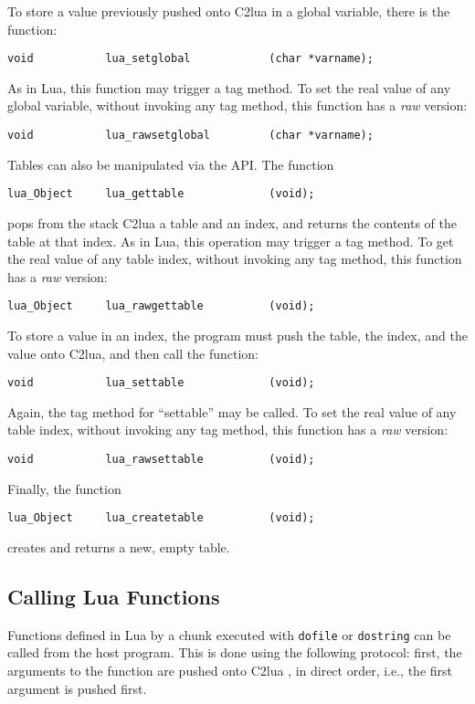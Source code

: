 To store a value previously pushed onto C2lua in a global variable,
there is the function:
\begin{verbatim}
void           lua_setglobal            (char *varname);
\end{verbatim}
As in Lua, this function may trigger a tag method.
To set the real value of any global variable,
without invoking any tag method,
this function has a \emph{raw} version:
\begin{verbatim}
void           lua_rawsetglobal         (char *varname);
\end{verbatim}

Tables can also be manipulated via the API.
The function
\begin{verbatim}
lua_Object     lua_gettable             (void);
\end{verbatim}
pops from the stack C2lua a table and an index,
and returns the contents of the table at that index.
As in Lua, this operation may trigger a tag method.
To get the real value of any table index,
without invoking any tag method,
this function has a \emph{raw} version:
\begin{verbatim}
lua_Object     lua_rawgettable          (void);
\end{verbatim}

To store a value in an index,
the program must push the table, the index,
and the value onto C2lua,
and then call the function:
\begin{verbatim}
void           lua_settable             (void);
\end{verbatim}
Again, the tag method for ``settable'' may be called.
To set the real value of any table index,
without invoking any tag method,
this function has a \emph{raw} version:
\begin{verbatim}
void           lua_rawsettable          (void);
\end{verbatim}

Finally, the function
\begin{verbatim}
lua_Object     lua_createtable          (void);
\end{verbatim}
creates and returns a new, empty table.


\subsection{Calling Lua Functions}
Functions defined in Lua by a chunk executed with
\verb|dofile| or \verb|dostring| can be called from the host program.
This is done using the following protocol:
first, the arguments to the function are pushed onto C2lua
, in direct order, i.e., the first argument is pushed first.

